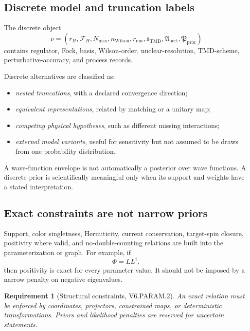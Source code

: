 \documentclass[11pt]{article}
\newtheorem{requirement}[definition]{Requirement}
\newcommand{\TMD}{\ensuremath{\mathrm{TMD}}}
\newcommand{\pert}{\mathrm{pert}}
\newcommand{\wil}{\mathrm{Wilson}}
\newcommand{\nuc}{\mathrm{nuc}}
\newcommand{\proc}{\mathrm{proc}}
\begin{document}
\subsection{Discrete model and truncation labels}

The discrete object
\begin{equation}
 \nu=
 \left(
 r_H,\mathcal F_H,N_{\max},
 n_{\wil},r_{\nuc},
 \mathfrak s_{\TMD},\mathfrak A_{\pert},
 \mathfrak P_{\proc}
 \right)
 \label{eq:discrete-label}
\end{equation}
contains regulator, Fock, basis, Wilson-order, nuclear-resolution, TMD-scheme,
perturbative-accuracy, and process records.

Discrete alternatives are classified as:
\begin{itemize}
\item \emph{nested truncations}, with a declared convergence direction;
\item \emph{equivalent representations}, related by matching or a unitary map;
\item \emph{competing physical hypotheses}, such as different missing
      interactions;
\item \emph{external model variants}, useful for sensitivity but not assumed
      to be draws from one probability distribution.
\end{itemize}

A wave-function envelope is not automatically a posterior over wave functions.
A discrete prior is scientifically meaningful only when its support and
weights have a stated interpretation.

\subsection{Exact constraints are not narrow priors}

Support, color singletness, Hermiticity, current conservation, target-spin
closure, positivity where valid, and no-double-counting relations are built
into the parameterization or graph.  For example, if
\begin{equation}
 \Phi=LL^\dagger ,
 \label{eq:structural-positive}
\end{equation}
then positivity is exact for every parameter value.  It should not be imposed
by a narrow penalty on negative eigenvalues.

\begin{requirement}[Structural constraints, V6.PARAM.2]
An exact relation must be enforced by coordinates, projectors, constrained
maps, or deterministic transformations.  Priors and likelihood penalties are
reserved for uncertain statements.
\end{requirement}
\end{document}
